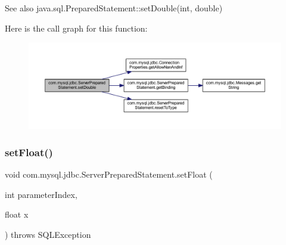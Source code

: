 \begin{DoxySeeAlso}{See also}
java.\+sql.\+Prepared\+Statement\+::set\+Double(int, double) 
\end{DoxySeeAlso}
Here is the call graph for this function\+:
\nopagebreak
\begin{figure}[H]
\begin{center}
\leavevmode
\includegraphics[width=350pt]{classcom_1_1mysql_1_1jdbc_1_1_server_prepared_statement_a50bb9137b1cec3fbff1140ed19785841_cgraph}
\end{center}
\end{figure}
\mbox{\label{classcom_1_1mysql_1_1jdbc_1_1_server_prepared_statement_ac1a444b7637bc226a3af13e86302dbe8}} 
\subsubsection{\texorpdfstring{set\+Float()}{setFloat()}}
{\footnotesize\ttfamily void com.\+mysql.\+jdbc.\+Server\+Prepared\+Statement.\+set\+Float (\begin{DoxyParamCaption}\item[{int}]{parameter\+Index,  }\item[{float}]{x }\end{DoxyParamCaption}) throws S\+Q\+L\+Exception}

